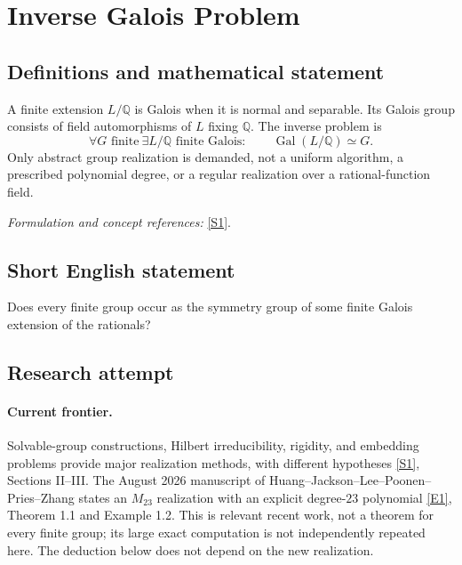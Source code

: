 \documentclass[11pt,a4paper]{article}
\newcommand{\Q}{\mathbb{Q}}
\newcommand{\sref}[2]{\hyperlink{source:#1:#2}{[S#2]}}
\newcommand{\eref}[2]{\hyperlink{extra:#1:#2}{[E#2]}}
\newif\ifshowcatalogue
\newcommand{\cataloguescope}[1]{\ifshowcatalogue
 \paragraph{Exact scope in the supplied catalogue.}
 \begin{quote}\small #1\end{quote}\fi}
\numberwithin{equation}{section}
\begin{document}
\setcounter{section}{0}
\clearpage
\section*{\texorpdfstring{Inverse Galois Problem}{Inverse Galois Problem}}\label{statement}
\subsection{Definitions and mathematical statement}
A finite extension $L/\Q$ is Galois when it is normal and separable. Its Galois group consists of field automorphisms of $L$ fixing $\Q$. The inverse problem is
\[
 \forall G\text{ finite}\ \exists L/\Q\text{ finite Galois}:\qquad
 \operatorname{Gal}(L/\Q)\simeq G.
\]
Only abstract group realization is demanded, not a uniform algorithm, a prescribed polynomial degree, or a regular realization over a rational-function field.
\par\smallskip\textit{Formulation and concept references:} \sref{statement}{1}.
\cataloguescope{Prove or disprove that every finite group G is isomorphic to the Galois group Gal(L/Q) of some finite Galois extension L of the rational numbers Q.}
\subsection{Short English statement}
Does every finite group occur as the symmetry group of some finite Galois extension of the rationals?
\subsection{Research attempt}

\paragraph{Current frontier.}
Solvable-group constructions, Hilbert irreducibility, rigidity, and embedding problems provide major realization methods, with different hypotheses \sref{statement}{1}, Sections II--III. The August 2026 manuscript of Huang--Jackson--Lee--Poonen--Pries--Zhang states an $M_{23}$ realization with an explicit degree-$23$ polynomial \eref{statement}{1}, Theorem 1.1 and Example 1.2. This is relevant recent work, not a theorem for every finite group; its large exact computation is not independently repeated here. The deduction below does not depend on the new realization.
\end{document}
